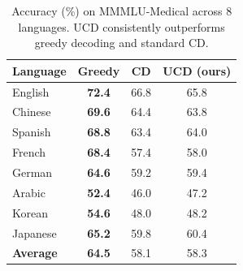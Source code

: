 \begin{table}[t]
\centering
\small
\begin{tabular}{lccc}
\toprule
Language & Greedy & CD & UCD (ours) \\
\midrule
English & \textbf{72.4} & 66.8 & 65.8 \\
Chinese & \textbf{69.6} & 64.4 & 63.8 \\
Spanish & \textbf{68.8} & 63.4 & 64.0 \\
French & \textbf{68.4} & 57.4 & 58.0 \\
German & \textbf{64.6} & 59.2 & 59.4 \\
Arabic & \textbf{52.4} & 46.0 & 47.2 \\
Korean & \textbf{54.6} & 48.0 & 48.2 \\
Japanese & \textbf{65.2} & 59.8 & 60.4 \\
\midrule
\textbf{Average} & \textbf{64.5} & 58.1 & 58.3 \\
\bottomrule
\end{tabular}
\caption{Accuracy (\%) on MMMLU-Medical across 8 languages. UCD consistently outperforms greedy decoding and standard CD.}
\label{tab:mmmlu_medical_main}
\end{table}